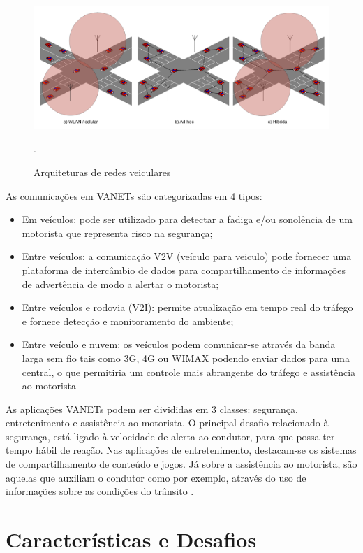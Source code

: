 \documentclass[
	12pt,				%
	oneside,			%
	a4paper,			%
	english,			%
	brazil				%
	]{abntex2ppgsi}
\begin{document}
\begin{figure} [t]
	\centering
	\includegraphics[width=0.8\columnwidth]{images/tipos_arquiteturas_vanets}
	\caption{Arquiteturas de redes veiculares\cite{luis2009melhoria}}.
	\label{fig:arquiteturas_vanets}
\end{figure}


As comunicações em VANETs são categorizadas em 4 tipos:
\begin{itemize}
	\item {Em veículos: pode ser utilizado para detectar a fadiga e/ou sonolência de um motorista que representa  risco na segurança;}
	\item {Entre veículos: a comunicação V2V (veículo para veiculo) pode fornecer uma plataforma de intercâmbio de dados para compartilhamento de informações de advertência de modo a alertar o motorista;}
	\item {Entre veículos e rodovia (V2I): permite atualização em tempo real do tráfego e fornece detecção e monitoramento do ambiente;}
	\item {Entre veículo e nuvem: os veículos podem comunicar-se através da banda larga sem fio tais como 3G, 4G ou WIMAX podendo enviar dados para uma central, o que permitiria um controle mais abrangente do tráfego e assistência ao motorista}
\end{itemize}


As aplicações VANETs podem ser divididas em 3 classes: segurança, entretenimento e assistência ao motorista. O principal desafio relacionado à segurança, está ligado à velocidade de alerta ao condutor, para que possa ter tempo hábil de reação. Nas aplicações de entretenimento, destacam-se os sistemas de compartilhamento de conteúdo e jogos. Já sobre a assistência ao motorista, são aquelas que auxiliam o condutor como por exemplo, através do uso de informações sobre as condições do trânsito \cite{souzasoaressbrc}.

\section{Características e Desafios}
\end{document}
